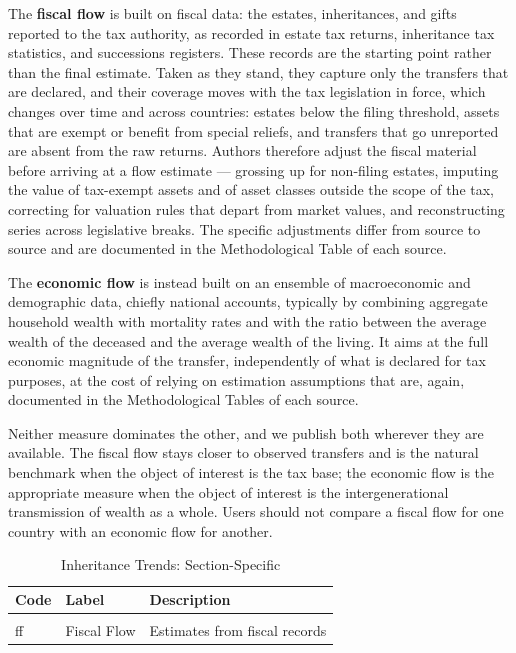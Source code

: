 \documentclass[
]{article}
\begin{document}
The \textbf{fiscal flow} is built on fiscal data: the estates,
inheritances, and gifts reported to the tax authority, as recorded in
estate tax returns, inheritance tax statistics, and successions
registers. These records are the starting point rather than the final
estimate. Taken as they stand, they capture only the transfers that are
declared, and their coverage moves with the tax legislation in force,
which changes over time and across countries: estates below the filing
threshold, assets that are exempt or benefit from special reliefs, and
transfers that go unreported are absent from the raw returns. Authors
therefore adjust the fiscal material before arriving at a flow estimate
--- grossing up for non-filing estates, imputing the value of tax-exempt
assets and of asset classes outside the scope of the tax, correcting for
valuation rules that depart from market values, and reconstructing
series across legislative breaks. The specific adjustments differ from
source to source and are documented in the Methodological Table of each
source.

The \textbf{economic flow} is instead built on an ensemble of
macroeconomic and demographic data, chiefly national accounts, typically
by combining aggregate household wealth with mortality rates and with
the ratio between the average wealth of the deceased and the average
wealth of the living. It aims at the full economic magnitude of the
transfer, independently of what is declared for tax purposes, at the
cost of relying on estimation assumptions that are, again, documented in
the Methodological Tables of each source.

Neither measure dominates the other, and we publish both wherever they
are available. The fiscal flow stays closer to observed transfers and is
the natural benchmark when the object of interest is the tax base; the
economic flow is the appropriate measure when the object of interest is
the intergenerational transmission of wealth as a whole. Users should
not compare a fiscal flow for one country with an economic flow for
another.

\begin{table}
\centering
\caption{\label{tab:dboard_inhe}Inheritance Trends: Section-Specific}
\centering
\begin{tabular}[t]{>{\raggedright\arraybackslash}p{2cm}>{\raggedright\arraybackslash}p{3cm}>{\raggedright\arraybackslash}p{11cm}}
\toprule
Code & Label & Description\\
\midrule
\cellcolor{gray!10}{ef} & \cellcolor{gray!10}{Economic Flow} & \cellcolor{gray!10}{Estimates from national accounts}\\
ff & Fiscal Flow & Estimates from fiscal records\\
\bottomrule
\end{tabular}
\end{table}
\end{document}
